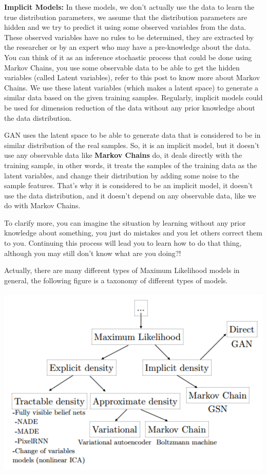 \documentclass{winnower}
\begin{document}
\textbf{Implicit Models:} In these models, we don’t actually use the data to learn the true distribution parameters, we assume that the distribution parameters are hidden and we try to predict it using some observed variables from the data. These observed variables have no rules to be determined, they are extracted by the researcher or by an expert who may have a pre-knowledge about the data. You can think of it as an inference stochastic process that could be done using Markov Chains, you use some observable data to be able to get the hidden variables (called Latent variables), refer to this post to know more about Markov Chains. We use these latent variables (which makes a latent space) to generate a similar data based on the given training samples. Regularly, implicit models could be used for dimension reduction of the data without any prior knowledge about the data distribution.\newline

GAN uses the latent space to be able to generate data that is considered to be in similar distribution of the real samples. So, it is an implicit model, but it doesn’t use any observable data like \textbf{Markov Chains} do, it deals directly with the training sample, in other words, it treats the samples of the training data as the latent variables, and change their distribution by adding some noise to the sample features. That’s why it is considered to be an implicit model, it doesn’t use the data distribution, and it doesn’t depend on any observable data, like we do with Markov Chains.\newline

To clarify more, you can imagine the situation by learning without any prior knowledge about something, you just do mistakes and you let others correct them to you. Continuing this process will lead you to learn how to do that thing, although you may still don’t know what are you doing?!\newline

Actually, there are many different types of Maximum Likelihood models in general, the following figure is a taxonomy of different types of models.\newline
\includegraphics[width=17cm, height=10cm]{taxo.png}
\end{document}
